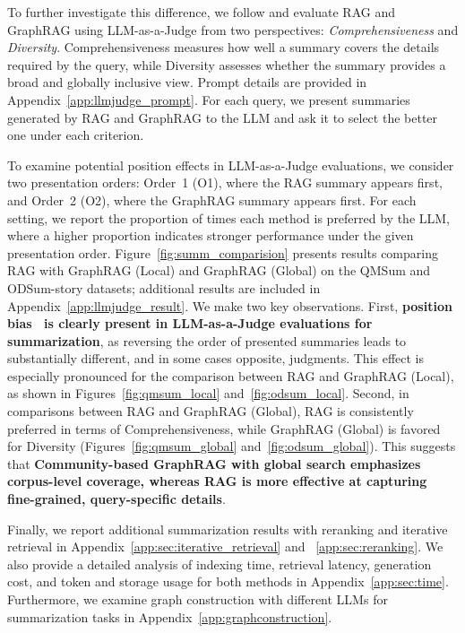 To further investigate this difference, we follow \citet{edge2024local} and evaluate RAG and GraphRAG using LLM-as-a-Judge from two perspectives: \emph{Comprehensiveness} and \emph{Diversity}. Comprehensiveness measures how well a summary covers the details required by the query, while Diversity assesses whether the summary provides a broad and globally inclusive view. Prompt details are provided in Appendix~\ref{app:llmjudge_prompt}. For each query, we present summaries generated by RAG and GraphRAG to the LLM and ask it to select the better one under each criterion.

To examine potential position effects in LLM-as-a-Judge evaluations, we consider two presentation orders: Order~1 (O1), where the RAG summary appears first, and Order~2 (O2), where the GraphRAG summary appears first. For each setting, we report the proportion of times each method is preferred by the LLM, where a higher proportion indicates stronger performance under the given presentation order.
Figure~\ref{fig:summ_comparision} presents results comparing RAG with GraphRAG (Local) and GraphRAG (Global) on the QMSum and ODSum-story datasets; additional results are included in Appendix~\ref{app:llmjudge_result}. We make two key observations. 
First, \textbf{position bias~\cite{shi2024judging, wang2024eliminating} is clearly present in LLM-as-a-Judge evaluations for summarization}, as reversing the order of presented summaries leads to substantially different, and in some cases opposite, judgments. This effect is especially pronounced for the comparison between RAG and GraphRAG (Local), as shown in Figures~\ref{fig:qmsum_local} and~\ref{fig:odsum_local}. 
Second, in comparisons between RAG and GraphRAG (Global), RAG is consistently preferred in terms of Comprehensiveness, while GraphRAG (Global) is favored for Diversity (Figures~\ref{fig:qmsum_global} and~\ref{fig:odsum_global}). This suggests that \textbf{Community-based GraphRAG with global search emphasizes corpus-level coverage, whereas RAG is more effective at capturing fine-grained, query-specific details}.

Finally, we report additional summarization results with reranking and iterative retrieval in Appendix~\ref{app:sec:iterative_retrieval} and ~\ref{app:sec:reranking}. We also provide a detailed analysis of indexing time, retrieval latency, generation cost, and token and storage usage for both methods in Appendix~\ref{app:sec:time}. Furthermore, we examine graph construction with different LLMs for summarization tasks in Appendix~\ref{app:graphconstruction}.



